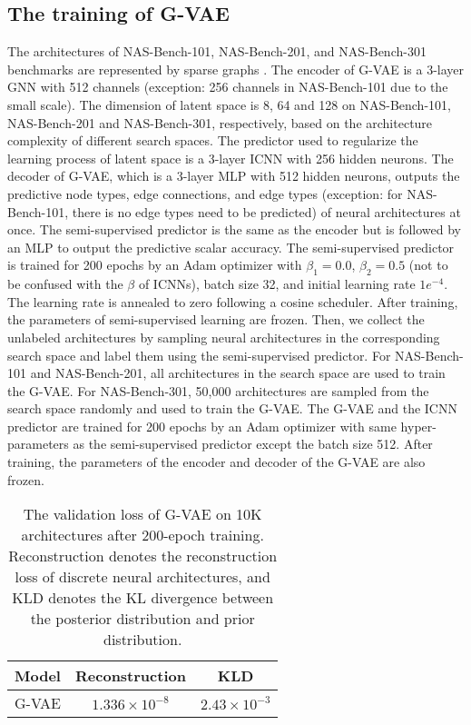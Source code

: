 \documentclass[10pt,twocolumn,letterpaper]{article}
\begin{document}
\subsection{The training of G-VAE} 
The architectures of NAS-Bench-101, NAS-Bench-201, and NAS-Bench-301 benchmarks are represented by sparse graphs \cite{fey2019fast}. The encoder of G-VAE is a 3-layer GNN with 512 channels (exception: 256 channels in NAS-Bench-101 due to the small scale). The dimension of latent space is 8, 64 and 128 on NAS-Bench-101, NAS-Bench-201 and NAS-Bench-301, respectively, based on the architecture complexity of different search spaces. The predictor used to regularize the learning process of latent space is a 3-layer ICNN with 256 hidden neurons. The decoder of G-VAE, which is a 3-layer MLP with 512 hidden neurons, outputs the predictive node types, edge connections, and edge types (exception: for NAS-Bench-101, there is no edge types need to be predicted) of neural architectures at once. The semi-supervised predictor is the same as the encoder but is followed by an MLP to output the predictive scalar accuracy. The semi-supervised predictor is trained for 200 epochs by an Adam optimizer with $\beta_{1} = 0.0$, $\beta_{2} = 0.5$ (not to be confused with the $\beta$ of ICNNs), batch size 32, and initial learning rate $1e^{-4}$. The learning rate is annealed to zero following a cosine scheduler. After training, the parameters of semi-supervised learning are frozen. Then, we collect the unlabeled architectures by sampling neural architectures in the corresponding search space and label them using the semi-supervised predictor. For NAS-Bench-101 and NAS-Bench-201, all architectures in the search space are used to train the G-VAE. For NAS-Bench-301, 50,000 architectures are sampled from the search space randomly and used to train the G-VAE. The G-VAE and the ICNN predictor are trained for 200 epochs by an Adam optimizer with same hyper-parameters as the semi-supervised predictor except the batch size 512. After training, the parameters of the encoder and decoder of the G-VAE are also frozen. 
\begin{table}
	\centering
	\caption{The validation loss of G-VAE on 10K architectures after 200-epoch training. Reconstruction denotes the reconstruction loss of discrete neural architectures, and KLD denotes the KL divergence between the posterior distribution and prior distribution.}
	\begin{tabular}{c|c|c}
		\toprule
		Model & Reconstruction & KLD \\
		\midrule
		G-VAE & $1.336\times10^{-8}$ & $2.43\times10^{-3}$  \\
		\bottomrule
	\end{tabular}
\end{table}
\end{document}
